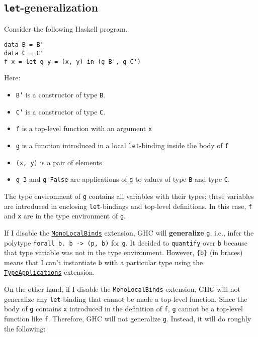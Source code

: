 \subsection{\texttt{let}-generalization}

Consider the following Haskell program.

\begin{verbatim}
data B = B'
data C = C'
f x = let g y = (x, y) in (g B', g C')
\end{verbatim}

Here:

\begin{itemize}
    \item \texttt{B'} is a constructor of type \texttt{B}.
    \item \texttt{C'} is a constructor of type \texttt{C}.
    \item \texttt{f} is a top-level function with an argument \texttt{x}
    \item \texttt{g} is a function introduced in a local \texttt{let}-binding inside the body of \texttt{f}
    \item \texttt{(x, y)} is a pair of elements
    \item \texttt{g 3} and \texttt{g False} are applications of \texttt{g} to values of type \texttt{B} and type \texttt{C}.
\end{itemize}

The type environment of \texttt{g} contains all variables with their types; these variables are introduced in enclosing \texttt{let}-bindings and top-level definitions. In this case, \texttt{f} and \texttt{x} are in the type environment of \texttt{g}.

If I disable the \href{https://ghc.gitlab.haskell.org/ghc/doc/users_guide/exts/let_generalisation.html}{\texttt{MonoLocalBinds}} extension, GHC will \textbf{generalize} \texttt{g}, i.e., infer the polytype \texttt{forall {b}. b -> (p, b)} for \texttt{g}. It decided to \texttt{quantify} over \texttt{b} because that type variable was not in the type environment. However, \texttt{\{b\}} (in braces) means that I can't instantiate \texttt{b} with a particular type using the \href{https://ghc.gitlab.haskell.org/ghc/doc/users_guide/exts/type_applications.html}{\texttt{TypeApplications}} extension.

On the other hand, if I disable the \texttt{MonoLocalBinds} extension, GHC will not generalize any \texttt{let}-binding that cannot be made a top-level function. Since the body of \texttt{g} contains \texttt{x} introduced in the definition of \texttt{f}, \texttt{g} cannot be a top-level function like \texttt{f}. Therefore, GHC will not generalize \texttt{g}. Instead, it will do roughly the following:

